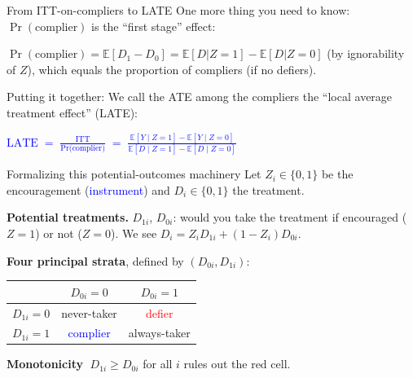 \documentclass[xcolor=dvipsnames]{beamer}
\newcommand\E{\mathbb{E}}
\begin{document}
\begin{frame}{From ITT-on-compliers to LATE}
\small
{} One more thing you need to know: $\Pr(\text{complier})$ is the ``first stage'' effect:\\

\bigskip

$\Pr(\text{complier}) = \E[D_1 - D_0] = \E[D|Z=1]-\E[D|Z=0]$ (by ignorability of $Z$), which equals the proportion of compliers (if no defiers).

\bigskip

 \small Putting it together: We call the ATE among the compliers the ``local average treatment effect'' (LATE):

\begin{center}
\textcolor{Blue}{$\displaystyle \text{LATE} \;=\; \frac{\text{ITT}}{\text{Pr(complier)}}\; = \; \frac{\E[Y\mid Z=1]-\E[Y\mid Z=0]}{\E[D\mid Z=1]-\E[D\mid Z=0]}$}
\end{center}
\end{frame}


\begin{frame}{Formalizing this potential-outcomes machinery}
\small
Let $Z_i\in\{0,1\}$ be the encouragement (\textcolor{Blue}{instrument}) and $D_i\in\{0,1\}$ the treatment.\\

\bigskip

\textbf{Potential treatments.} $D_{1i}$, $D_{0i}$: would you take the treatment if encouraged ($Z=1$) or not ($Z=0$).
\smallskip
We see $D_i = Z_i D_{1i} + (1-Z_i) D_{0i}$.
\medskip

\textbf{Four principal strata}, defined by $(D_{0i},D_{1i})$:
\begin{center}
\begin{tabular}{l|cc}
& $D_{0i}=0$ & $D_{0i}=1$\\\hline
$D_{1i}=0$ & never-taker & \textcolor{Red}{defier}\\
$D_{1i}=1$ & \textcolor{Blue}{complier} & always-taker\\
\end{tabular}
\end{center}

\medskip
\textbf{Monotonicity} $\;D_{1i}\geq D_{0i}$ for all $i$ rules out the red cell.
\end{frame}
\end{document}
